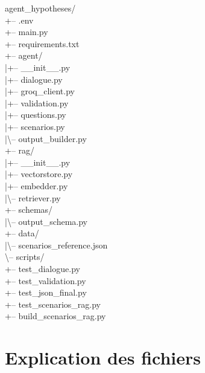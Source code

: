 \documentclass[12pt, a4paper]{report}
\begin{document}
\begin{codebox}
agent\_hypotheses/\\
\quad{}+-- .env\\
\quad{}+-- main.py\\
\quad{}+-- requirements.txt\\
\quad{}+-- agent/\\
\quad{}|\quad{}+-- \_\_init\_\_.py\\
\quad{}|\quad{}+-- dialogue.py\\
\quad{}|\quad{}+-- groq\_client.py\\
\quad{}|\quad{}+-- validation.py\\
\quad{}|\quad{}+-- questions.py\\
\quad{}|\quad{}+-- scenarios.py\\
\quad{}|\quad{}\textbackslash{}-- output\_builder.py\\
\quad{}+-- rag/\\
\quad{}|\quad{}+-- \_\_init\_\_.py\\
\quad{}|\quad{}+-- vectorstore.py\\
\quad{}|\quad{}+-- embedder.py\\
\quad{}|\quad{}\textbackslash{}-- retriever.py\\
\quad{}+-- schemas/\\
\quad{}|\quad{}\textbackslash{}-- output\_schema.py\\
\quad{}+-- data/\\
\quad{}|\quad{}\textbackslash{}-- scenarios\_reference.json\\
\quad{}\textbackslash{}-- scripts/\\
\quad{}\quad{}\quad{}+-- test\_dialogue.py\\
\quad{}\quad{}\quad{}+-- test\_validation.py\\
\quad{}\quad{}\quad{}+-- test\_json\_final.py\\
\quad{}\quad{}\quad{}+-- test\_scenarios\_rag.py\\
\quad{}\quad{}\quad{}+-- build\_scenarios\_rag.py
\end{codebox}

\section{Explication des fichiers}
\end{document}
